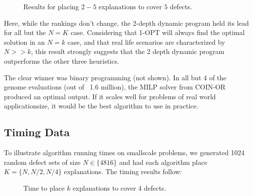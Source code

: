 \documentclass[11pt,twocolumn]{article}
\begin{document}
\begin{figure}[ht!]
  \caption{Results for placing $2-5$ explanations to cover $5$ defects.}
\end{figure}
\FloatBarrier
Here, while the rankings don't change, the 2-depth dynamic program held its lead for all but the $N=K$ case.  Considering that 1-OPT will always find the optimal solution in an $N=k$ case, and that real life scenarios are characterized by $N>>k$, this result strongly suggests that the 2 depth dynamic program outperforms the other three heuristics.  

The clear winner was binary programming (not shown).  In all but 4 of the genome evaluations (out of ~1.6 million), the MILP solver from COIN-OR produced an optimal output.  If it scales well for problems of real world applicationsize, it would be the best algorithm to use in practice.

\FloatBarrier

\subsection{Timing Data}

To illustrate algorithm running times on smallscale problems, we generated 1024 random defect sets of size $N \in \{4 8 16\}$ and had each algorithm place $K = \{ N, N/2, N/4\}$ explanations.  The timing results follow:

\begin{figure}[h!]
  \caption{Time to place $k$ explanations to cover 4 defects.}
\end{figure}
\FloatBarrier
\end{document}
